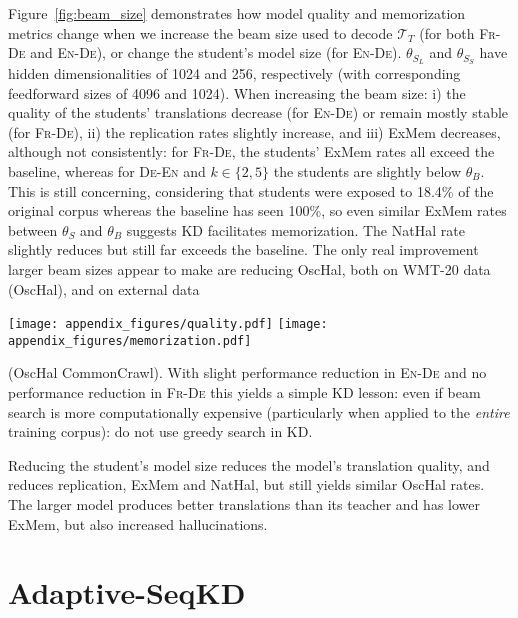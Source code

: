 Figure~\ref{fig:beam_size} demonstrates how model quality and memorization metrics change when we increase the beam size used to decode $\mathcal{T}_T$ (for both \textsc{Fr}-\textsc{De} and \textsc{En}-\textsc{De}), or change the student's model size (for \textsc{En}-\textsc{De}). $\theta_{S_{L}}$ and $\theta_{S_{S}}$ have hidden dimensionalities of 1024 and 256, respectively (with corresponding feedforward sizes of 4096 and 1024).
When increasing the beam size: i) the quality of the students' translations decrease (for \textsc{En}-\textsc{De}) or remain mostly stable (for \textsc{Fr}-\textsc{De}), ii) the replication rates slightly increase, and iii) ExMem decreases, although not consistently: for \textsc{Fr}-\textsc{De}, the students' ExMem rates all exceed the baseline, whereas for \textsc{De}-\textsc{En} and $k\in\{2,5\}$ the students are slightly below $\theta_B$. This is still concerning, considering that students were exposed to 18.4\% of the original corpus whereas the baseline has seen 100\%, so even similar ExMem rates between $\theta_S$ and $\theta_B$ suggests KD facilitates memorization.
The NatHal rate slightly reduces but still far exceeds the baseline. The only real improvement larger beam sizes appear to make are reducing OscHal, both on WMT-20 data (OscHal), and on external data
\noindent\begin{minipage}{\textwidth}
    \centering
    \texttt{[image: appendix\_figures/quality.pdf]}
    \texttt{[image: appendix\_figures/memorization.pdf]}
    \label{fig:beam_size}
\vspace{0.2cm}
\end{minipage}
(OscHal CommonCrawl). With slight performance reduction in \textsc{En-De} and no performance reduction in \textsc{Fr-De} this yields a simple KD lesson: even if beam search is more computationally expensive (particularly when applied to the \textit{entire} training corpus): do not use greedy search in KD.

Reducing the student's model size reduces the model's translation quality, and reduces replication, ExMem and NatHal, but still yields similar OscHal rates. The larger model produces better translations than its teacher and has lower ExMem, but also increased hallucinations.

\section{Adaptive-SeqKD}
\label{ap:Adaptive-SeqKD}

